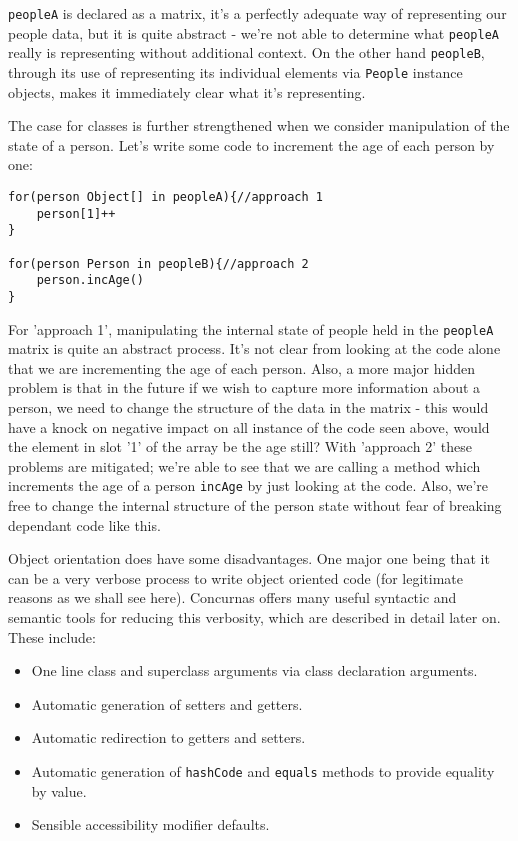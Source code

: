 \documentclass[conc-doc]{subfiles}
\begin{document}
\lstinline{peopleA} is declared as a matrix, it's a perfectly adequate way of representing our people data, but it is quite abstract - we're not able to determine what \lstinline{peopleA} really is representing without additional context. On the other hand \lstinline{peopleB}, through its use of representing its individual elements via \lstinline{People} instance objects, makes it immediately clear what it's representing.

The case for classes is further strengthened when we consider manipulation of the state of a person. Let's write some code to increment the age of each person by one:

\begin{lstlisting}
for(person Object[] in peopleA){//approach 1
	person[1]++
}

for(person Person in peopleB){//approach 2
	person.incAge()
}
\end{lstlisting}

For 'approach 1', manipulating the internal state of people held in the \lstinline{peopleA} matrix is quite an abstract process. It's not clear from looking at the code alone that we are incrementing the age of each person. Also, a more major hidden problem is that in the future if we wish to capture more information about a person, we need to change the structure of the data in the matrix - this would have a knock on negative impact on all instance of the code seen above, would the element in slot '1' of the array be the age still? With 'approach 2' these problems are mitigated; we're able to see that we are calling a method which increments the age of a person \lstinline{incAge} by just looking at the code. Also, we're free to change the internal structure of the person state without fear of breaking dependant code like this.

Object orientation does have some disadvantages. One major one being that it can be a very verbose process to write object oriented code (for legitimate reasons as we shall see here). Concurnas offers many useful syntactic and semantic tools for reducing this verbosity, which are described in detail later on. These include:
\begin{itemize}
	\item One line class and superclass arguments via class declaration arguments.
	\item Automatic generation of setters and getters.
	\item Automatic redirection to getters and setters.
	\item Automatic generation of \lstinline{hashCode} and \lstinline{equals} methods to provide equality by value.
	\item Sensible accessibility modifier defaults.
\end{itemize}
\end{document}
